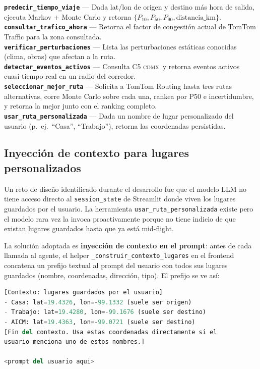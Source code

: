 \documentclass[11pt,a4paper]{article}
\newcommand{\CDMX}{\textsc{cdmx}}
\begin{document}
\begin{keybox}
\textbf{\texttt{predecir\_tiempo\_viaje}} ---
Dada lat/lon de origen y destino más hora de salida, ejecuta
Markov + Monte Carlo y retorna
$\{P_{10}, P_{50}, P_{90}, \text{distancia\_km}\}$.\\[0.3em]
\textbf{\texttt{consultar\_trafico\_ahora}} ---
Retorna el factor de congestión actual de TomTom Traffic para la
zona consultada.\\[0.3em]
\textbf{\texttt{verificar\_perturbaciones}} ---
Lista las perturbaciones estáticas conocidas (clima, obras) que
afectan a la ruta.\\[0.3em]
\textbf{\texttt{detectar\_eventos\_activos}} ---
Consulta C5 \CDMX\ y retorna eventos activos cuasi-tiempo-real
en un radio del corredor.\\[0.3em]
\textbf{\texttt{seleccionar\_mejor\_ruta}} ---
Solicita a TomTom Routing hasta tres rutas alternativas, corre
Monte Carlo sobre cada una, rankea por P50 e incertidumbre, y
retorna la mejor junto con el ranking completo.\\[0.3em]
\textbf{\texttt{usar\_ruta\_personalizada}} ---
Dada un nombre de lugar personalizado del usuario
(p.\ ej.\ ``Casa'', ``Trabajo''), retorna las coordenadas
persistidas.
\end{keybox}

\subsection{Inyección de contexto para lugares personalizados}
\label{sec:contexto}

Un reto de diseño identificado durante el desarrollo fue que el
modelo LLM no tiene acceso directo al \texttt{session\_state} de
Streamlit donde viven los lugares guardados por el usuario. La
herramienta \texttt{usar\_ruta\_personalizada} existe pero el
modelo rara vez la invoca proactivamente porque no tiene indicio
de que existan lugares guardados hasta que ya está mid-flight.

La solución adoptada es \textbf{inyección de contexto en el
prompt}: antes de cada llamada al agente, el helper
\texttt{\_construir\_contexto\_lugares} en el frontend concatena
un prefijo textual al prompt del usuario con todos sus lugares
guardados (nombre, coordenadas, dirección, tipo). El prefijo se
ve así:

\begin{lstlisting}[language=Python,caption={Prefijo inyectado
antes del prompt del usuario (extracto)}]
[Contexto: lugares guardados por el usuario]
- Casa: lat=19.4326, lon=-99.1332 (suele ser origen)
- Trabajo: lat=19.4280, lon=-99.1676 (suele ser destino)
- AICM: lat=19.4363, lon=-99.0721 (suele ser destino)
[Fin del contexto. Usa estas coordenadas directamente si el
usuario menciona uno de estos nombres.]

<prompt del usuario aqui>
\end{lstlisting}
\end{document}
